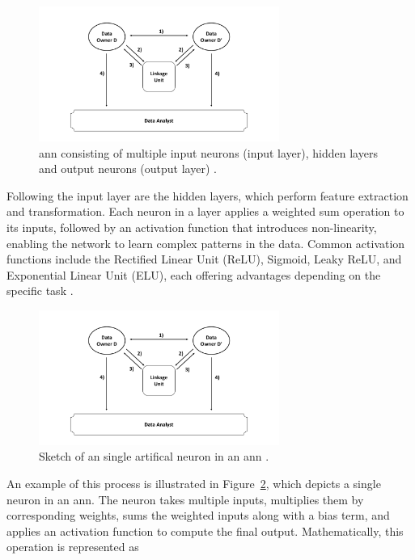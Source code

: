 \begin{figure}[H]
  \centering
  \includegraphics[width=0.7\textwidth, page=16]{img/visualization.pdf}
  \caption{\ac{ann} consisting of multiple input neurons (input layer), hidden layers and output neurons (output layer) \cite{annimage}.}
  \label{fig:annexample}
\end{figure}


Following the input layer are the hidden layers, which perform feature extraction and transformation.
Each neuron in a layer applies a weighted sum operation to its inputs, followed by an activation function that introduces non-linearity, enabling the network to learn complex patterns in the data. Common activation functions include the Rectified Linear Unit (ReLU), Sigmoid, Leaky ReLU, and Exponential Linear Unit (ELU), each offering advantages depending on the specific task \cite{sharma2017activation,russell2016artificial}.

\begin{figure}[H]
  \centering
  \includegraphics[width=0.7\textwidth, page=17]{img/visualization.pdf}
  \caption{Sketch of an single artifical neuron in an \ac{ann} \cite{neuronimage}.}
  \label{fig:neuronexample}
\end{figure}

An example of this process is illustrated in Figure~\ref{fig:neuronexample}, which depicts a single neuron in an \ac{ann}.
The neuron takes multiple inputs, multiplies them by corresponding weights, sums the weighted inputs along with a bias term, and applies an activation function to compute the final output.
Mathematically, this operation is represented as

